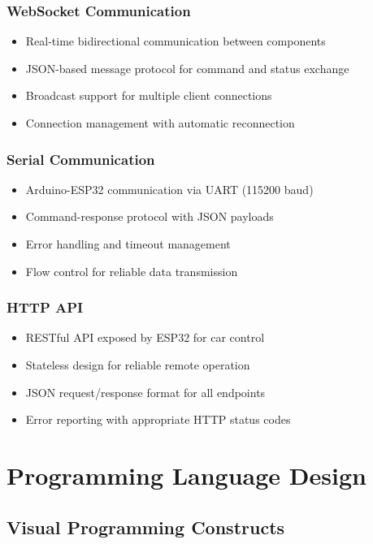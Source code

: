 \subsubsection{WebSocket Communication}
\begin{itemize}
    \item Real-time bidirectional communication between components
    \item JSON-based message protocol for command and status exchange
    \item Broadcast support for multiple client connections
    \item Connection management with automatic reconnection
\end{itemize}

\subsubsection{Serial Communication}
\begin{itemize}
    \item Arduino-ESP32 communication via UART (115200 baud)
    \item Command-response protocol with JSON payloads
    \item Error handling and timeout management
    \item Flow control for reliable data transmission
\end{itemize}

\subsubsection{HTTP API}
\begin{itemize}
    \item RESTful API exposed by ESP32 for car control
    \item Stateless design for reliable remote operation
    \item JSON request/response format for all endpoints
    \item Error reporting with appropriate HTTP status codes
\end{itemize}

\section{Programming Language Design}

\subsection{Visual Programming Constructs}

